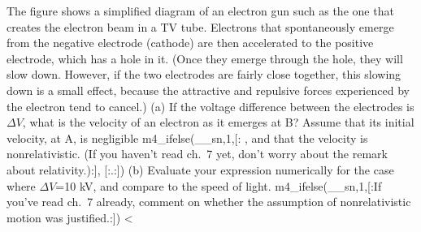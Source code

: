 The figure shows a simplified diagram of an electron
        gun such as the 
        one that creates the electron beam in a TV tube. Electrons
        that spontaneously emerge from the negative electrode
        (cathode) are then accelerated to the positive electrode,
        which has a hole in it. (Once they emerge through the hole,
        they will slow down. However, if the two electrodes are
        fairly close together, this slowing down is a small effect,
        because the attractive and repulsive forces experienced by
        the electron tend to cancel.) \hwendpart
        (a) If the voltage difference
        between the electrodes is $\Delta V$, what is the velocity
        of an electron as it emerges at B? Assume that its initial
        velocity, at A, is negligible%
m4_ifelse(__sn,1,[:%
, and that the velocity is nonrelativistic.
        (If you haven't read ch.~7 yet, don't worry about the remark about
        relativity.):],
[:.:])
        \answercheck\hwendpart
        (b) Evaluate your
        expression numerically for the case where $\Delta V$=10 kV,
        and compare to the speed of light.
        m4_ifelse(__sn,1,[:If you've read ch.~7 already,
        comment on whether the assumption
        of nonrelativistic motion was justified.:])%
        <%
